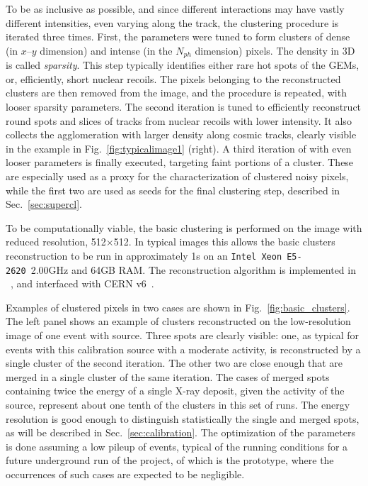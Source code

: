 To be as inclusive as possible, and since different interactions may
have vastly different intensities, even varying along the track, the
clustering procedure is iterated three times.  First, the \dbscan
parameters were tuned to form clusters of dense (in $x$--$y$ dimension)
and intense (in the $N_{ph}$ dimension) pixels. The density in 3D is
called \textit{sparsity}.  This step typically identifies either rare
hot spots of the GEMs, or, efficiently, short nuclear recoils. The
pixels belonging to the reconstructed clusters are then removed from
the image, and the \dbscan procedure is repeated, with looser sparsity
parameters. The second iteration is tuned to efficiently reconstruct
\fe round spots and slices of tracks from nuclear recoils with lower
intensity. It also collects the agglomeration with larger density
along cosmic tracks, clearly visible in the example in
Fig.~\ref{fig:typicalimage1} (right).  A third iteration of \dbscan
with even looser parameters is finally executed, targeting faint
portions of a cluster. These are especially used as a proxy for the
characterization of clustered noisy pixels, while the first two are
used as seeds for the final clustering step, described in
Sec.~\ref{sec:supercl}.

To be computationally viable, the \idbscan basic clustering is
performed on the image with reduced resolution, 512$\times$512. In
typical images this allows the basic clusters reconstruction to be run
in approximately 1\unit{s} on an \texttt{Intel Xeon
E5-2620}~2.00\unit{GHz} and 64\unit{GB} RAM. The reconstruction
algorithm is implemented in \PYTHONthree~\cite{python3}, and
interfaced with CERN \ROOT v6~\cite{root}.


Examples of clustered pixels in two cases are shown in
Fig.~\ref{fig:basic_clusters}. The left panel shows an example of
clusters reconstructed on the low-resolution image of one event
with \fe source. Three spots are clearly visible: one, as typical for
events with this calibration source with a moderate activity, is
reconstructed by a single cluster of the second iteration. The other
two are close enough that are merged in a single cluster of the same
iteration. The cases of merged spots containing twice the energy of a
single X-ray deposit, given the activity of the \fe source, represent
about one tenth of the clusters in this set of runs. The energy
resolution is good enough to distinguish statistically the single and
merged spots, as will be described in Sec.~\ref{sec:calibration}.  The
optimization of the \idbscan parameters is done assuming a low pileup
of events, typical of the running conditions for a future underground
run of the \cygno project, of which \lemon is the prototype, where the
occurrences of such cases are expected to be negligible.

